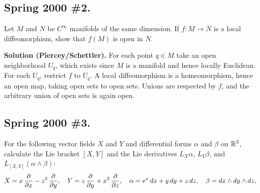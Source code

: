 \documentclass[10pt]{article}
\numberwithin{equation}{subsection}
\begin{document}
\subsection{Spring 2000 \#2.}

Let $M$ and $N$ be $C^\infty$ manifolds of the same dimension.  If $f:M \to N$
is a local diffeomorphism, show that $f(M)$ is open in $N$.

\textbf{Solution (Piercey/Schettler).} For each point $q \in M$ take an open
neighborhood $U_q$, which exists since $M$ is a manifold and hence locally
Euclidean.  For each $U_q$, restrict $f$ to $U_q$.  A local diffeomorphism is a
homeomorphism, hence an open map, taking open sets to open sets.  Unions are
respected by $f$, and the arbitrary union of open sets is again open.

\subsection{Spring 2000 \#3.}

For the following vector fields $X$ and $Y$ and differential forms $\alpha$ and
$\beta$ on $\mathbb{R}^3$, calculate the Lie bracket $[X,Y]$ and the Lie derivatives
$L_X \alpha$, $L_Y \beta$, and $L_{[X,Y]}(\alpha\wedge\beta)$:
$$
	X = x\,\frac{\partial}{\partial x} - z^2\,\frac{\partial}{\partial y}, \quad
	Y = z\,\frac{\partial}{\partial y} + x^3\,\frac{\partial}{\partial z}, \quad
	\alpha = e^x\,dx + y\,dy + z\,dz, \quad
	\beta = dx\wedge dy \wedge dz.
$$
\end{document}

